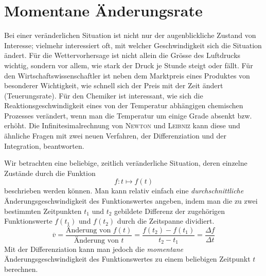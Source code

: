 \documentclass[%
11pt,%
twoside,%
titlepage,%
german,%
headsepline%
]{scrartcl}
\begin{document}
\section{Momentane \"Anderungsrate}
Bei einer ver\"anderlichen Situation ist nicht nur der augenblickliche Zustand von Interesse; vielmehr interessiert oft, mit welcher Geschwindigkeit sich die Situation \"andert. F\"ur die Wettervorhersage ist nicht allein die Gr\"osse des Luftdrucks wichtig, sondern vor allem, wie stark der Druck je Stunde steigt oder f\"allt. F\"ur den Wirtschaftswissenschaftler ist neben dem Marktpreis eines Produktes von besonderer Wichtigkeit, wie schnell sich der Preis mit der Zeit \"andert (Teuerungsrate). F\"ur den Chemiker ist interessant, wie sich die Reaktionsgeschwindigkeit eines von der Temperatur abh\"angigen chemischen Prozesses ver\"andert, wenn man die Temperatur um einige Grade absenkt bzw. erh\"oht.
Die Infinitesimalrechnung von \textsc{Newton} und \textsc{Leibniz} kann diese und \"ahnliche Fragen mit zwei neuen Verfahren, der Differenziation und der Integration, beantworten.

Wir betrachten eine beliebige, zeitlich ver\"anderliche Situation, deren einzelne Zust\"ande durch die Funktion
$$f: t\mapsto f(t)$$
beschrieben werden k\"onnen. Man kann relativ einfach eine \emph{durchschnittliche} \"An\-derungs\-ge\-schwin\-dig\-keit des
Funktionswertes angeben, indem man die zu zwei bestimmten Zeitpunkten $t_1$ und $t_2$ gebildete Differenz der zugeh\"origen Funktionswerte $f(t_1)$ und $f(t_2)$ durch die Zeitspanne dividiert.
$$\overline{v}=\frac{\text{\"Anderung von }f(t)}{\text{\"Anderung von }t}=\frac{f(t_2)-f(t_1)}{t_2-t_1}=\frac{\Delta f}{\Delta t}$$
Mit der Differenziation kann man jedoch die \emph{momentane} \"An\-derungs\-ge\-schwin\-dig\-keit des Funktionswertes zu einem beliebigen Zeitpunkt $t$ berechnen.
\end{document}

